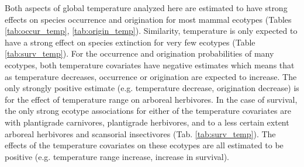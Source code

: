\documentclass[12pt,letterpaper]{article}
\begin{document}
Both aspects of global temperature analyzed here are estimated to have strong effects on species occurrence and origination for most mammal ecotypes (Tables \ref{tab:occur_temp}, \ref{tab:origin_temp}). Similarity, temperature is only expected to have a strong effect on species extinction for very few ecotypes (Table \ref{tab:surv_temp}). For the occurrence and origination probabilities of many ecotypes, both temperature covariates have negative estimates which means that as temperature decreases, occurrence or origination are expected to increase. The only strongly positive estimate (e.g. temperature decrease, origination decrease) is for the effect of temperature range on arboreal herbivores. In the case of survival, the only strong ecotype associations for either of the temperature covariates are with plantigrade carnivores, plantigrade herbivores, and to a less certain extent arboreal herbivores and scansorial insectivores (Tab. \ref{tab:surv_temp}). The effects of the temperature covariates on these ecotypes are all estimated to be positive (e.g. temperature range increase, increase in survival).
\end{document}
